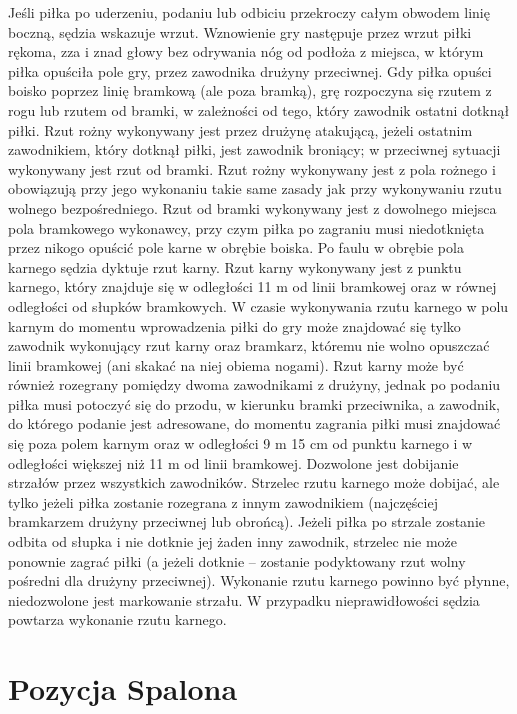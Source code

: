 \documentclass[14pt,oneside,a4paper]{book}
\theoremstyle{break}
\begin{document}
Jeśli piłka po uderzeniu, podaniu lub odbiciu przekroczy całym obwodem linię boczną, sędzia wskazuje wrzut. Wznowienie gry następuje przez wrzut piłki rękoma, zza i znad głowy bez odrywania nóg od podłoża z miejsca, w którym piłka opuściła pole gry, przez zawodnika drużyny przeciwnej. Gdy piłka opuści boisko poprzez linię bramkową (ale poza bramką), grę rozpoczyna się rzutem z rogu lub rzutem od bramki, w zależności od tego, który zawodnik ostatni dotknął piłki. Rzut rożny wykonywany jest przez drużynę atakującą, jeżeli ostatnim zawodnikiem, który dotknął piłki, jest zawodnik broniący; w przeciwnej sytuacji wykonywany jest rzut od bramki. Rzut rożny wykonywany jest z pola rożnego i obowiązują przy jego wykonaniu takie same zasady jak przy wykonywaniu rzutu wolnego bezpośredniego. Rzut od bramki wykonywany jest z dowolnego miejsca pola bramkowego wykonawcy, przy czym piłka po zagraniu musi niedotknięta przez nikogo opuścić pole karne w obrębie boiska.
Po faulu w obrębie pola karnego sędzia dyktuje rzut karny. Rzut karny wykonywany jest z punktu karnego, który znajduje się w odległości 11 m od linii bramkowej oraz w równej odległości od słupków bramkowych. W czasie wykonywania rzutu karnego w polu karnym do momentu wprowadzenia piłki do gry może znajdować się tylko zawodnik wykonujący rzut karny oraz bramkarz, któremu nie wolno opuszczać linii bramkowej (ani skakać na niej obiema nogami). Rzut karny może być również rozegrany pomiędzy dwoma zawodnikami z drużyny, jednak po podaniu piłka musi potoczyć się do przodu, w kierunku bramki przeciwnika, a zawodnik, do którego podanie jest adresowane, do momentu zagrania piłki musi znajdować się poza polem karnym oraz w odległości 9 m 15 cm od punktu karnego i w odległości większej niż 11 m od linii bramkowej. Dozwolone jest dobijanie strzałów przez wszystkich zawodników. Strzelec rzutu karnego może dobijać, ale tylko jeżeli piłka zostanie rozegrana z innym zawodnikiem (najczęściej bramkarzem drużyny przeciwnej lub obrońcą). Jeżeli piłka po strzale zostanie odbita od słupka i nie dotknie jej żaden inny zawodnik, strzelec nie może ponownie zagrać piłki (a jeżeli dotknie – zostanie podyktowany rzut wolny pośredni dla drużyny przeciwnej). Wykonanie rzutu karnego powinno być płynne, niedozwolone jest markowanie strzału. W przypadku nieprawidłowości sędzia powtarza wykonanie rzutu karnego.

\section {Pozycja Spalona}
\end{document}
